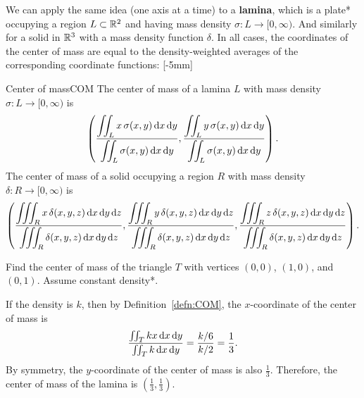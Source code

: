 \documentclass{watsonbook}
\begin{document}
We can apply the same idea (one axis at a time) to a \textbf{lamina},
which is a plate* occupying a region $L\subset \mathbb{R}^2$ and having mass
density $\sigma:L \to [0,\infty)$. And similarly for a solid in $\mathbb{R}^3$
with a mass density function $\delta$. In all cases, the coordinates
of the center of mass are equal to the density-weighted averages of
the corresponding coordinate functions: [-5mm]

\begin{defn}{Center of mass}{COM}
  The {center of mass} of a lamina $L$ with mass density $\sigma:L \to [0,\infty)$ is
  \[
    \left(
      \frac{\displaystyle{\iint_L x \, \sigma(x,y) \, \mathrm{d}x \, \mathrm{d}y}}
      {\displaystyle{\iint_L \sigma(x,y) \, \mathrm{d}x \, \mathrm{d}y}},
      \frac{\displaystyle{\iint_L y \, \sigma(x,y) \, \mathrm{d}x \, \mathrm{d}y}}
      {\displaystyle{\iint_L \sigma(x,y) \, \mathrm{d}x \, \mathrm{d}y}}
    \right). 
  \]
    The center of mass of a solid occupying a region $R$ with mass density $\delta:R \to [0,\infty)$ is
  \[
    \left(
      \frac{\displaystyle{\iiint_R x \, \delta(x,y,z) \, \mathrm{d}x \, \mathrm{d}y \, \mathrm{d}z}}
      {\displaystyle{\iiint_R \delta(x,y,z) \, \mathrm{d}x \, \mathrm{d}y \, \mathrm{d}z}},
      \frac{\displaystyle{\iiint_R y \, \delta(x,y,z) \, \mathrm{d}x \, \mathrm{d}y \, \mathrm{d}z}}
      {\displaystyle{\iiint_R \delta(x,y,z) \, \mathrm{d}x \, \mathrm{d}y \, \mathrm{d}z}},
      \frac{\displaystyle{\iiint_R z \, \delta(x,y,z) \, \mathrm{d}x \, \mathrm{d}y \, \mathrm{d}z}}
      {\displaystyle{\iiint_R \delta(x,y,z) \, \mathrm{d}x \, \mathrm{d}y \, \mathrm{d}z}}
    \right). 
  \]
\end{defn}

\begin{example}{}{}
  Find the center of mass of the triangle $T$ with vertices $(0,0)$,
  $(1,0)$, and $(0,1)$. Assume constant density*. 
\end{example}

\begin{solution}
  If the density is $k$, then by Definition~\ref{defn:COM}, the
  $x$-coordinate of the center of mass is
  \[
    \frac{\iint_T kx \, \mathrm{d} x \, \mathrm{d} y}{\iint_T k \, \mathrm{d} x \, \mathrm{d} y}  =\frac{k/6}{k/2} = \frac{1}{3}. 
  \]
  By symmetry, the $y$-coordinate of the center of mass is also
  $\tfrac{1}{3}$. Therefore, the center of mass of the lamina is
  $\boxed{\left(\tfrac{1}{3}, \tfrac{1}{3}\right)}$.
\end{solution}
\end{document}
